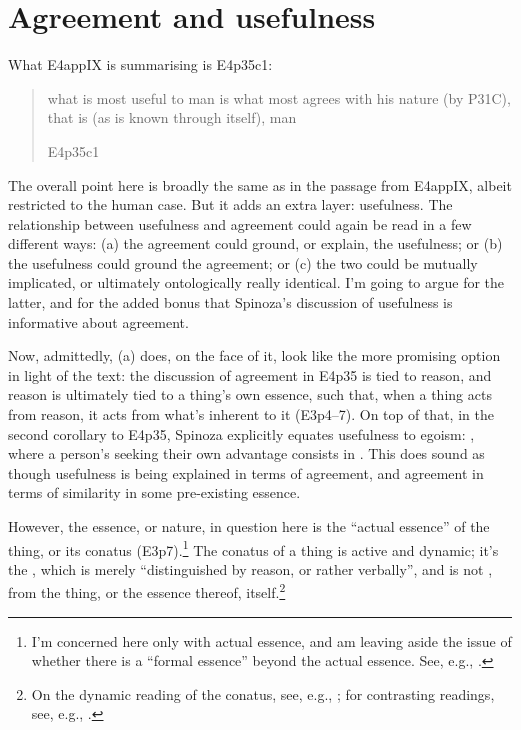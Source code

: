 \documentclass{article}
\newcommand\foreign[2]{\foreignlanguage{#1}{\emph{#2}}}
\begin{document}
\section{Agreement and usefulness}\label{sec:Use}

What E4app\RN{9} is summarising is E4p35c1: \blockquote[E4p35c1]{what is most useful to man is what most agrees \textins{\foreign{latin}{convenit}} with his nature (by P31C), that is (as is known through itself), man}. The overall point here is broadly the same as in the passage from E4app\RN{9}, albeit restricted to the human case. But it adds an extra layer: usefulness. The relationship between usefulness and agreement could again be read in a few different ways: (a) the agreement could ground, or explain, the usefulness; or (b) the usefulness could ground the agreement; or (c) the two could be mutually implicated, or ultimately ontologically really identical. I'm going to argue for the latter, and for the added bonus that Spinoza's discussion of usefulness is informative about agreement.

Now, admittedly, (a) does, on the face of it, look like the more promising option in light of the text: the discussion of agreement in E4p35 is tied to reason, and reason is ultimately tied to a thing's own essence, such that, when a thing acts from reason, it acts from what's inherent to it (E3p4–7). On top of that, in the second corollary to E4p35, Spinoza explicitly equates usefulness to egoism: , where a person's seeking their own advantage consists in . This does sound as though usefulness is being explained in terms of agreement, and agreement in terms of similarity in some pre-existing essence.

However, the essence, or nature, in question here is the \enquote{actual essence} of the thing, or its conatus (E3p7).\footnote{I'm concerned here only with actual essence, and am leaving aside the issue of whether there is a \enquote{formal essence} beyond the actual essence. See, e.g., \cites{Laerke:2017,Nadler:2012,Ward:2011}.}
The conatus of a thing is active and dynamic; it's the , which is merely \enquote{distinguished by reason, or rather verbally}, and is not , from the thing, or the essence thereof, itself.\footnote{On the dynamic reading of the conatus, see, e.g., \cites{Williams:2019}[][Part 4, ch. 13]{RenzExplainability}; for contrasting readings, see, e.g., \cites{Bennett:1984}{DellaRocca:1996}{Viljanen:2011}.}
\end{document}
